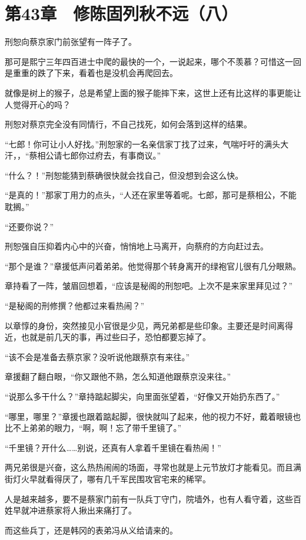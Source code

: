 \section{第43章　修陈固列秋不远（八）}

刑恕向蔡京家门前张望有一阵子了。

那可是熙宁三年四百进士中爬的最快的一个，一说起来，哪个不羡慕？可惜这一回是重重的跌了下来，看着也是没机会再爬回去。

就像是树上的猴子，总是希望上面的猴子能摔下来，这世上还有比这样的事更能让人觉得开心的吗？

刑恕对蔡京完全没有同情行，不自己找死，如何会落到这样的结果。

“七郎！你可让小人好找。”刑恕家的一名亲信家丁找了过来，气喘吁吁的满头大汗，，“蔡相公请七郎你过府去，有事商议。”

“什么？！”刑恕能猜到蔡确很快就会找自己，但没想到会这么快。

“是真的！”那家丁用力的点头，“人还在家里等着呢。七郎，那可是蔡相公，不能耽搁。”

“还要你说？”

刑恕强自压抑着内心中的兴奋，悄悄地上马离开，向蔡府的方向赶过去。

“那个是谁？”章援低声问着弟弟。他觉得那个转身离开的绿袍官儿很有几分眼熟。

章持看了一阵，皱眉回想着，“应该是秘阁的刑恕吧。上次不是来家里拜见过？”

“是秘阁的刑修撰？他都过来看热闹？”

以章惇的身份，突然接见小官很是少见，两兄弟都是些印象。主要还是时间离得近，也就是前几天的事，再过些曰子，恐怕都要忘掉了。

“该不会是准备去蔡京家？没听说他跟蔡京有来往。”

章援翻了翻白眼，“你又跟他不熟，怎么知道他跟蔡京没来往。”

“说那么多干什么？”章持踮起脚尖，向里面张望着，“好像又开始扔东西了。”

“哪里，哪里？”章援也跟着踮起脚，很快就叫了起来，他的视力不好，戴着眼镜也比不上弟弟的眼力，“啊，啊！忘了带千里镜了。”

“千里镜？开什么……别说，还真有人拿着千里镜在看热闹！”

两兄弟很是兴奋，这么热热闹闹的场面，寻常也就是上元节放灯才能看见。而且满街灯火早就看得厌了，哪有几千军民围攻官宅来的稀罕。

人是越来越多，要不是蔡家门前有一队兵丁守门，院墙外，也有人看守着，这些百姓早就冲进蔡家将人揪出来痛打了。

而这些兵丁，还是韩冈的表弟冯从义给请来的。

